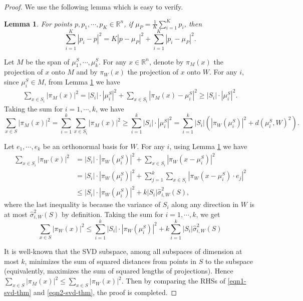 \documentclass[11pt,letter]{article}
\newtheorem{lemma}{Lemma}
\begin{document}
\begin{proof}
We use the following lemma which is easy to verify.
\begin{lemma}\label{lem:pythagorean}
For points $p, p_1, \cdots, p_K \in \mathbb R^n$, if $\mu_{P} = \frac1K\sum_{i=1}^K p_i$, then
\[
\sum_{i=1}^K |p_i - p|^2 = K|p - \mu_P|^2 + \sum_{i=1}^K |p_i - \mu_P|^2.
\]
\end{lemma}

Let $M$ be the span of $\mu_1^S, \cdots, \mu_k^S$. For any $x\in \mathbb R^n$, denote by $\pi_M(x)$ the projection of $x$ onto $M$ and by $\pi_W(x)$ the projection of $x$ onto $W$. For any $i$, since $\mu_i^S \in M$, from Lemma \ref{lem:pythagorean} we have
\begin{equation*}
\begin{aligned}
\sum_{x\in S_i} |\pi_M(x)|^2 = |S_i|\cdot|\mu_i^S|^2 + \sum_{x\in S_i} |\pi_M(x) - \mu_i^S|^2 
\ge |S_i|\cdot|\mu_i^S|^2.
\end{aligned}
\end{equation*}
Taking the sum for $i=1, \cdots, k$, we have
\begin{equation} \label{eqn1-svd-thm}
\sum_{x\in S}|\pi_M(x)|^2 = \sum_{i=1}^k \sum_{x\in S_i} |\pi_M(x)|^2
\ge \sum_{i=1}^k |S_i|\cdot|\mu_i^S|^2
= \sum_{i=1}^k |S_i| \left( |\pi_W(\mu_i^S)|^2 + d(\mu_i^S, W)^2 \right).
\end{equation}

Let $e_1, \cdots, e_k$ be an orthonormal basis for $W$. For any $i$, using Lemma \ref{lem:pythagorean} we have
\begin{equation*}
\begin{aligned}
\sum_{x\in S_i} |\pi_W(x)|^2 &= |S_i|\cdot|\pi_W(\mu_i^S)|^2 + \sum_{x\in S_i} |\pi_W(x - \mu_i^S)|^2\\
&= |S_i|\cdot|\pi_W(\mu_i^S)|^2 + \sum_{j=1}^k \sum_{x\in S_i} |\pi_W(x - \mu_i^S)\cdot e_j|^2\\
&\le |S_i|\cdot|\pi_W(\mu_i^S)|^2 + k|S_i| \hat \sigma_{i, W}^2(S),
\end{aligned}
\end{equation*}
where the last inequality is because the variance of $S_i$ along any direction in $W$ is at most $\hat \sigma_{i, W}^2(S)$ by definition. Taking the sum for $i=1,\cdots,k$, we get
\begin{equation} \label{eqn2-svd-thm}
\sum_{x\in S} |\pi_W(x)|^2 \le \sum_{i=1}^k |S_i|\cdot|\pi_W(\mu_i^S)|^2 + k\sum_{i=1}^k |S_i| \hat \sigma_{i, W}^2(S)
\end{equation}

It is well-known that the SVD subspace, among all subspaces of dimension at most $k$, minimizes the sum of squared distances from points in $S$ to the subspace (equivalently, maximizes the sum of squared lengths of projections). Hence $\sum_{x\in S}|\pi_M(x)|^2 \le \sum_{x\in S}|\pi_W(x)|^2$. Then by comparing the RHSs of \eqref{eqn1-svd-thm} and \eqref{eqn2-svd-thm}, the proof is completed.
\end{proof}
\end{document}
